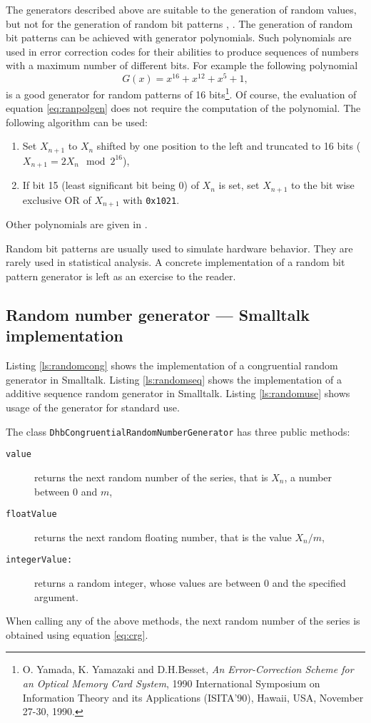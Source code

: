 \documentclass[twoside]{book}
\begin{document}
 The generators described above
are suitable to the generation of random values, but not for the
generation of random bit patterns \cite{Knuth2}, \cite{Press}. The
generation of random bit patterns can be achieved with generator
polynomials. Such polynomials are used in error correction codes
for their abilities to produce sequences of numbers with a maximum
number of different bits. For example the following polynomial
\begin{equation}
\label{eq:ranpolgen}
  G\left(x\right) = x^{16} + x^{12} +x^5 + 1,
\end{equation}
is a good generator for random patterns of 16 bits\footnote{\cf O.
Yamada, K. Yamazaki and D.H.Besset, {\em An Error-Correction
Scheme for an Optical Memory Card System}, 1990 International
Symposium on Information Theory and its Applications (ISITA'90),
Hawaii, USA, November 27-30, 1990.}. Of course, the evaluation of
equation \ref{eq:ranpolgen} does not require the computation of
the polynomial. The following algorithm can be used: {\parskip 0pt
\begin{enumerate}
  \item Set $X_{n+1}$ to $X_n$ shifted by one position to the left
  and truncated to 16 bits ($X_{n+1}=2X_n \mod 2^{16}$),
  \item If bit 15 (least significant bit being 0) of $X_n$ is set,
  set $X_{n+1}$ to the bit wise exclusive OR of $X_{n+1}$ with
  {\tt 0x1021}.
\end{enumerate}}
\noindent Other polynomials are given in \cite{Press}.

Random bit patterns are usually used to simulate hardware
behavior. They are rarely used in statistical analysis. A concrete
implementation of a random bit pattern generator is left as an
exercise to the reader.

\subsection{Random number generator --- Smalltalk implementation}
 Listing \ref{ls:randomcong} shows
the implementation of a congruential random generator in
Smalltalk. Listing \ref{ls:randomseq} shows the implementation of
a additive sequence random generator in Smalltalk. Listing
\ref{ls:randomuse} shows usage of the generator for standard use.

\noindent The class {\tt DhbCongruentialRandomNumberGenerator} has
three public methods:
\begin{description}
  \item[\tt value] returns the next random number of the series,
  that is $X_n$, a number between $0$ and $m$,
  \item[\tt floatValue] returns the next random floating number,
  that is the value $X_n / m$,
  \item[\tt integerValue:] returns a random integer, whose values
  are between 0 and the specified argument.
\end{description}
When calling any of the above methods, the next random number of
the series is obtained using equation \ref{eq:crg}.
\end{document}
